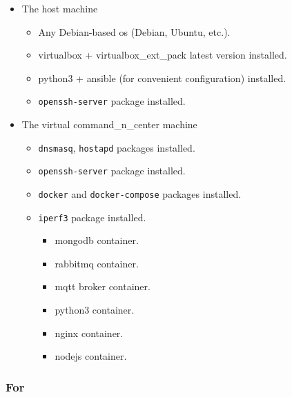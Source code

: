 \begin{itemize}
\tightlist
\item
  The host machine

\begin{itemize}
	\tightlist
	\item
	Any Debian-based \acrshort{os} (Debian, Ubuntu, etc.).
	\item
	\gls{virtualbox} + \gls{virtualbox_ext_pack} latest version installed.
	\item
	\gls{python3} + \gls{ansible} (for convenient configuration) installed.
	\item
	\texttt{openssh-server} package installed.
\end{itemize}
\item
  The virtual \gls{command_n_center} machine

  \begin{itemize}
  \tightlist
  \item
    \texttt{dnsmasq}, \texttt{hostapd} packages installed.
  \item
    \texttt{openssh-server} package installed.
  \item
    \texttt{docker} and \texttt{docker-compose} packages installed.
  \item
  	\texttt{iperf3} package installed.

    \begin{itemize}
    \tightlist
    \item
      \gls{mongodb} container.
    \item
      \gls{rabbitmq} container.
    \item
      \gls{mqtt} broker container.
    \item
      \gls{python3} container.
    \item
      \gls{nginx} container.
    \item
      \gls{nodejs} container.
    \end{itemize}
  \end{itemize}
\end{itemize}

\subsubsection{For }\label{for-aps}


